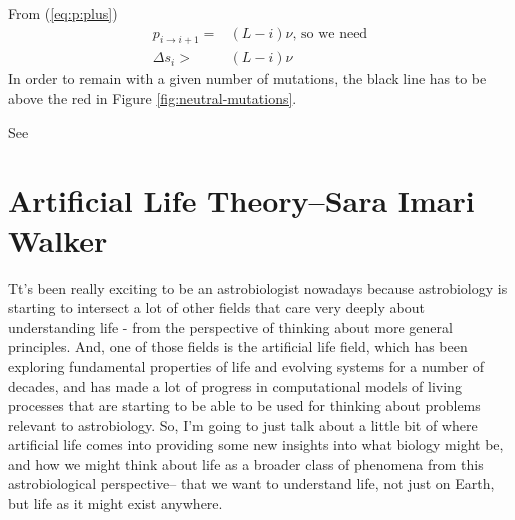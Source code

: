 \documentclass[]{article}
\begin{document}
From (\ref{eq:p:plus})
\begin{align*}
	p_{i\rightarrow i+1} =& (L-i)\nu \text{, so we need}\\
	\Delta s_i > & (L-i)\nu
\end{align*}
In order to remain with a given number of mutations, the black line has to be above the red in Figure \ref{fig:neutral-mutations}.

See \cite{eigen1978hypercycle,eigen1988molecular,eigen2002error,crotty2001rna,stadtler2002fitness_landscapes,wessner2010origins}


\section[Artificial Life Theory]{Artificial Life Theory--Sara Imari Walker}

Tt's been really exciting
to be an astrobiologist nowadays
because astrobiology is starting to
intersect a lot of other fields
that care very deeply about
understanding life -
from the perspective of thinking about
more general principles.
And, one of those fields is
the artificial life field,
which has been exploring
fundamental properties of life
and evolving systems
for a number of decades,
and has made a lot of progress
in computational models
of living processes that are starting to
be able to be used for thinking
about problems relevant to astrobiology.
So, I'm going to just talk about
a little bit of where artificial life comes
into providing some new insights
into what biology might be,
and how we might think about life
as a broader class of phenomena
from this astrobiological perspective--
that we want to understand life, not just on Earth, but life as it might exist anywhere.
\end{document}

